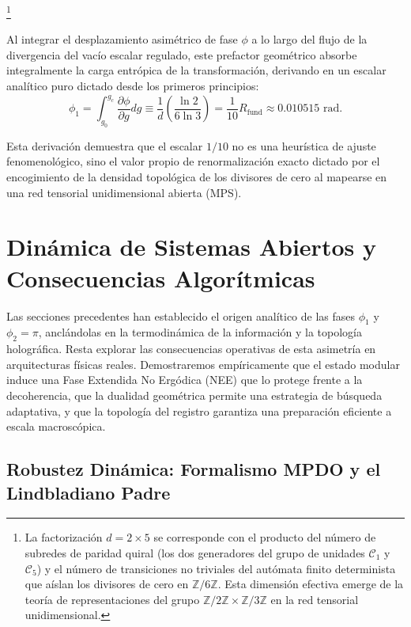 \documentclass[12pt,a4paper]{article}
\theoremstyle{plain}
\theoremstyle{definition}
\theoremstyle{remark}
\begin{document}
\footnote{La factorización $d = 2 \times 5$ se corresponde con el producto del número de subredes de paridad quiral (los dos generadores del grupo de unidades $\mathcal{C}_1$ y $\mathcal{C}_5$) y el número de transiciones no triviales del autómata finito determinista que aíslan los divisores de cero en $\mathbb{Z}/6\mathbb{Z}$. Esta dimensión efectiva emerge de la teoría de representaciones del grupo $\mathbb{Z}/2\mathbb{Z} \times \mathbb{Z}/3\mathbb{Z}$ en la red tensorial unidimensional.}

Al integrar el desplazamiento asimétrico de fase $\phi$ a lo largo del flujo de la divergencia del vacío escalar regulado, este prefactor geométrico absorbe integralmente la carga entrópica de la transformación, derivando en un escalar analítico puro dictado desde los primeros principios:
\begin{equation}
\phi_1 = \int_{g_0}^{g_c} \frac{\partial \phi}{\partial g} dg \equiv \frac{1}{d} \left( \frac{\ln 2}{6\ln 3} \right) = \frac{1}{10} R_{\text{fund}} \approx 0.010515 \text{ rad}.
\label{eq:phi1_exact_derivation}
\end{equation}

Esta derivación demuestra que el escalar $1/10$ no es una heurística de ajuste fenomenológico, sino el valor propio de renormalización exacto dictado por el encogimiento de la densidad topológica de los divisores de cero al mapearse en una red tensorial unidimensional abierta (MPS).

\section{Dinámica de Sistemas Abiertos y Consecuencias Algorítmicas}
\label{sec:consecuencias}

Las secciones precedentes han establecido el origen analítico de las fases $\phi_1$ y $\phi_2 = \pi$, anclándolas en la termodinámica de la información y la topología holográfica. Resta explorar las consecuencias operativas de esta asimetría en arquitecturas físicas reales. Demostraremos empíricamente que el estado modular induce una Fase Extendida No Ergódica (NEE) que lo protege frente a la decoherencia, que la dualidad geométrica permite una estrategia de búsqueda adaptativa, y que la topología del registro garantiza una preparación eficiente a escala macroscópica.

\subsection{Robustez Dinámica: Formalismo MPDO y el Lindbladiano Padre}
\label{subsec:robustez_dinamica}
\end{document}
